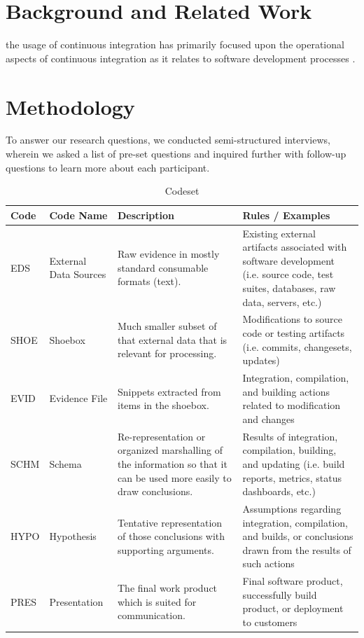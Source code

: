 \documentclass{sig-alternate}
\begin{document}
\section{Background and Related Work}

the usage of continuous integration has primarily focused upon the operational aspects of continuous integration as it relates to software development processes \cite{miller:hundreddays}\cite{olsson:climbingstairway}.

\section{Methodology} \label{method}

To answer our research questions, we conducted semi-structured interviews, wherein we asked a list of pre-set questions and inquired further with follow-up questions to learn more about each participant. \\

\begin{table}
\label{table:codeset}
\centering
\caption{Codeset}
\begin{tabular}[b]{ | l | l | p{5.5cm} | p{6.5cm} | }
	\hline
	\rowcolor{black!20!} Code & Code Name & Description & Rules / Examples \\ \hline
	EDS & External Data Sources & Raw evidence in mostly standard consumable formats (text). & Existing external artifacts associated with software development (i.e. source code, test suites, databases, raw data, servers, etc.) \\ \hline
	SHOE & Shoebox & Much smaller subset of that external data that is relevant for processing. & Modifications to source code or testing artifacts (i.e. commits, changesets, updates) \\ \hline
	EVID & Evidence File & Snippets extracted from items in the shoebox. & Integration, compilation, and building actions related to modification and changes \\ \hline
	SCHM & Schema & Re-representation or organized marshalling of the information so that it can be used more easily to draw conclusions. & Results of integration, compilation, building, and updating (i.e. build reports, metrics, status dashboards, etc.) \\ \hline
	HYPO & Hypothesis & Tentative representation of those conclusions with supporting arguments. & Assumptions regarding integration, compilation, and builds, or conclusions drawn from the results of such actions \\ \hline
	PRES & Presentation & The final work product which is suited for communication. & Final software product, successfully build product, or deployment to customers \\ \hline
\end{tabular}
\end{table}
\end{document}
